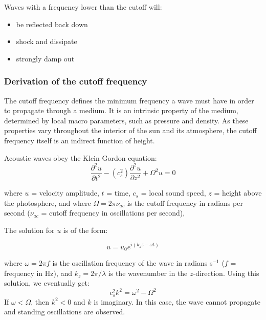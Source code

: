 Waves with a frequency lower than the cutoff will:
\begin{itemize}
    \item be reflected back down
    \item shock and dissipate
    \item strongly damp out
\end{itemize}



\clearpage
\subsubsection{Derivation of the cutoff frequency}

The cutoff frequency defines the minimum frequency a wave must have in order to
propagate through a medium.
It is an intrinsic property of the medium,
determined by local macro parameters, such as pressure and density.
As these properties vary throughout the interior of the sun and its atmosphere,
the cutoff frequency itself is an indirect function of height.


Acoustic waves obey the Klein Gordon equation:
\begin{equation}
    \frac{\partial^{2}u}{\partial t^{2}}
    - \left( c_{s}^{2} \right)
    \frac{\partial^{2}u}{\partial z^{2}}
    + \Omega^{2}u
    = 0
\end{equation}

where
$u$ = velocity amplitude,
$t$ = time,
$c_{s}$ = local sound speed,
$z$ = height above the photosphere, and
where $\Omega = 2\pi\nu_{ac}$
is the cutoff frequency in radians per second
($\nu_{ac}$ = cutoff frequency in oscillations per second),


The solution for $u$ is of the form:

\begin{equation}
    u = u_{0}e^{i\left( k_{z}z - \omega t \right)}
\end{equation}

where $\omega = 2 \pi f$ is the oscillation frequency of the wave
in radians s$^{-1}$ ($f$ = frequency in Hz), and $k_{z} = 2\pi/\lambda$
is the wavenumber in the $z$-direction.
Using this solution, we eventually get:
\begin{equation}
    c_{s}^{2} k^{2} = \omega^{2} - \Omega^{2}
\end{equation}
If $\omega < \Omega$, then $k^{2} < 0$ and $k$ is imaginary.
In this case, the wave cannot propagate and standing oscillations are
observed.

